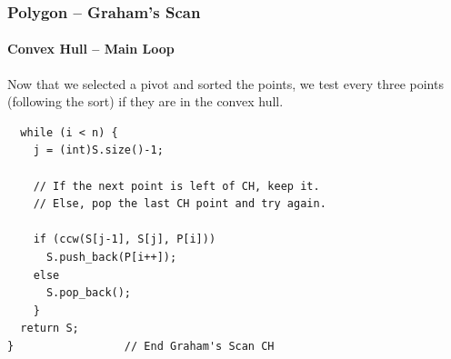 \begin{frame}[fragile]
  \frametitle{Polygon -- Graham's Scan}
  \framesubtitle{Convex Hull -- Main Loop}

Now that we selected a pivot and sorted the points, we test every three points (following the sort) if they are in the convex hull.

  {\small
    \begin{exampleblock}{}
\begin{verbatim}
  while (i < n) {
    j = (int)S.size()-1;

    // If the next point is left of CH, keep it.
    // Else, pop the last CH point and try again.

    if (ccw(S[j-1], S[j], P[i]))
      S.push_back(P[i++]);
    else
      S.pop_back();
    }
  return S;
}                 // End Graham's Scan CH
\end{verbatim}
\end{exampleblock}}
\end{frame}
